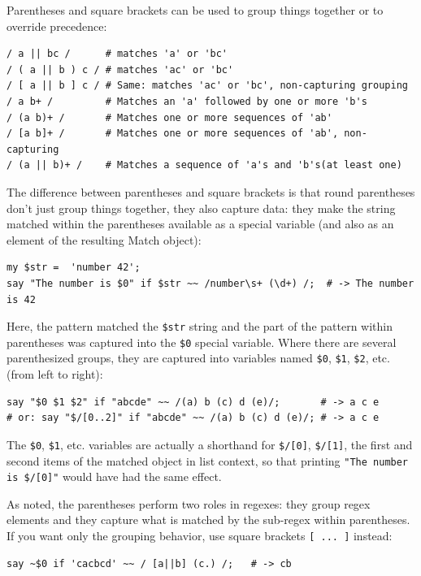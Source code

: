 Parentheses and square brackets can be used to group 
things together or to override precedence:

\begin{verbatim}
/ a || bc /      # matches 'a' or 'bc'
/ ( a || b ) c / # matches 'ac' or 'bc'
/ [ a || b ] c / # Same: matches 'ac' or 'bc', non-capturing grouping
/ a b+ /         # Matches an 'a' followed by one or more 'b's
/ (a b)+ /       # Matches one or more sequences of 'ab'
/ [a b]+ /       # Matches one or more sequences of 'ab', non-capturing
/ (a || b)+ /    # Matches a sequence of 'a's and 'b's(at least one)
\end{verbatim}
%

The difference between parentheses and square brackets is 
that round parentheses don't just group things together, 
they also capture data: they make the string matched within 
the parentheses available as a special variable (and also 
as an element of the resulting Match object):

\begin{verbatim}
my $str =  'number 42';
say "The number is $0" if $str ~~ /number\s+ (\d+) /;  # -> The number is 42
\end{verbatim}
%

Here, the pattern matched the \verb'$str' string and the 
part of the pattern within parentheses was captured into 
the \verb'$0' special variable. Where there are several 
parenthesized groups, they are captured into variables 
named \verb'$0', \verb'$1',  \verb'$2', etc. (from 
left to right):

\begin{verbatim}
say "$0 $1 $2" if "abcde" ~~ /(a) b (c) d (e)/;       # -> a c e
# or: say "$/[0..2]" if "abcde" ~~ /(a) b (c) d (e)/; # -> a c e
\end{verbatim}
%

The \verb'$0', \verb'$1', etc. variables are actually a 
shorthand for \verb'$/[0]', \verb'$/[1]', the first and 
second items of the matched 
object in list context, so that printing  
\verb'"The number is $/[0]"' would have had the same 
effect. 

As noted, the parentheses perform two roles in regexes: 
they group regex elements and they capture what is matched 
by the sub-regex within parentheses. If you want only the 
grouping behavior, use square brackets
\verb'[ ... ]' instead:

\begin{verbatim}
say ~$0 if 'cacbcd' ~~ / [a||b] (c.) /;   # -> cb
\end{verbatim}
%

